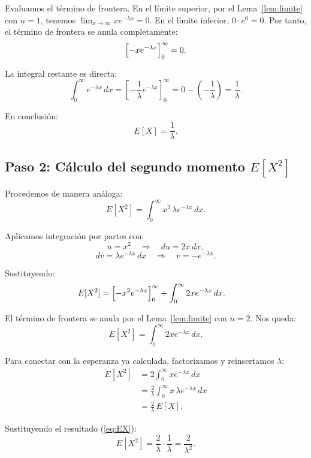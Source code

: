 \documentclass{article}
\theoremstyle{definition}
\begin{document}
    Evaluamos el término de frontera. En el límite superior, por el Lema~\ref{lem:limite} con $n=1$, tenemos $\lim_{x \to \infty} x e^{-\lambda x} = 0$. En el límite inferior, $0 \cdot e^{0} = 0$. Por tanto, el término de frontera se anula completamente:
    $$ \Bigl[ -x e^{-\lambda x} \Bigr]_0^\infty = 0. $$

    La integral restante es directa:
    $$ \int_{0}^{\infty} e^{-\lambda x} \, dx = \left[ -\frac{1}{\lambda} e^{-\lambda x} \right]_0^\infty = 0 - \left(-\frac{1}{\lambda}\right) = \frac{1}{\lambda}. $$

    En conclusión:
    \begin{equation} \label{eq:EX}
        E[X] = \frac{1}{\lambda}.
    \end{equation}

    \subsection*{Paso 2: Cálculo del segundo momento $E[X^2]$}

    Procedemos de manera análoga:
    $$ E[X^2] = \int_{0}^{\infty} x^2 \, \lambda e^{-\lambda x} \, dx. $$

    Aplicamos integración por partes con:
    $$ u = x^2 \quad \Rightarrow \quad du = 2x \, dx, $$
    $$ dv = \lambda e^{-\lambda x} \, dx \quad \Rightarrow \quad v = -e^{-\lambda x}. $$

    Sustituyendo:
    \begin{align*}
        E[X^2] &= \Bigl[ -x^2 e^{-\lambda x} \Bigr]_0^\infty + \int_{0}^{\infty} 2x e^{-\lambda x} \, dx.
    \end{align*}

    El término de frontera se anula por el Lema~\ref{lem:limite} con $n=2$. Nos queda:
    $$ E[X^2] = \int_{0}^{\infty} 2x e^{-\lambda x} \, dx. $$

    Para conectar con la esperanza ya calculada, factorizamos y reinsertamos $\lambda$:
    \begin{align*}
        E[X^2] &= 2 \int_{0}^{\infty} x e^{-\lambda x} \, dx \\[4pt]
               &= \frac{2}{\lambda} \int_{0}^{\infty} x \, \lambda e^{-\lambda x} \, dx \\[4pt]
               &= \frac{2}{\lambda} \, E[X].
    \end{align*}

    Sustituyendo el resultado (\ref{eq:EX}):
    \begin{equation} \label{eq:EX2}
        E[X^2] = \frac{2}{\lambda} \cdot \frac{1}{\lambda} = \frac{2}{\lambda^2}.
    \end{equation}
\end{document}
